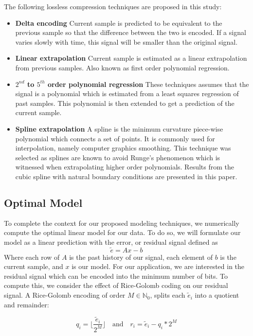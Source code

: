 \documentclass[journal]{IEEEtran}
\begin{document}
The following lossless compression techniques are proposed in this study:
\begin{itemize}
  \item \textbf{Delta encoding} Current sample is predicted to be equivalent to the previous sample so that the difference between the two is encoded. If a signal varies slowly with time, this signal will be smaller than the original signal.
  \item \textbf{Linear extrapolation} Current sample is estimated as a linear extrapolation from previous samples. Also known as first order polynomial regression.
  \item \textbf{\boldmath$2^{nd}$ to \boldmath$5^{th}$ order polynomial regression} These techniques assumes that the signal is a polynomial which is estimated from a least squares regression of past samples. This polynomial is then extended to get a prediction of the current sample.
  \item \textbf{Spline extrapolation} A spline is the minimum curvature piece-wise polynomial which connects a set of points. It is commonly used for interpolation, namely computer graphics smoothing. This technique was selected as splines are known to avoid Runge's phenomenon which is witnessed when extrapolating higher order polynomials. Results from the cubic spline with natural boundary conditions are presented in this paper.
\end{itemize}

\subsection{Optimal Model}

To complete the context for our proposed modeling techniques, we numerically compute the optimal linear model for our data. To do so, we will formulate our model as a linear prediction with the error, or residual signal defined as
$$\tilde{e} = Ax-b$$
Where each row of $A$ is the past history of our signal, each element of $b$ is the current sample, and $x$ is our model. For our application, we are interested in the residual signal which can be encoded into the minimum number of bits. To compute this, we consider the effect of Rice-Golomb coding on our residual signal. A Rice-Golomb encoding of order $M \in \mathbb{N}_0$, splits each $\tilde{e}_i$ into a quotient and remainder:

$$ q_i = \lfloor \frac{\tilde{e}_i}{2^M} \rfloor\quad \textrm{and} \quad r_i = \tilde{e}_i - q_i * 2^M  $$
\end{document}
